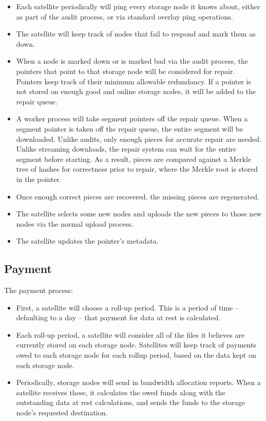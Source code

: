 \documentclass[11pt,fleqn,openany]{book}
\begin{document}
\begin{itemize}
\item Each satellite periodically will ping every storage node it knows
about,
  either as part of the audit process, or via standard overlay ping operations.
\item The satellite will keep track of nodes that fail to respond and mark
  them as down.
\item When a node is marked down or is marked bad via the audit process, the
  pointers that point to that storage node will be considered for repair.
  Pointers
  keep track of their minimum allowable redundancy. If a pointer is not stored
  on enough good and online storage nodes, it will be added to the repair queue.
\item A worker process will take segment pointers off the repair queue. When
  a segment pointer is taken off the repair queue, the entire segment will be
  downloaded. Unlike audits, only enough pieces for accurate repair are needed.
  Unlike streaming downloads, the repair system can wait for the entire segment
  before starting. As a result, pieces are compared against a Merkle tree of
  hashes for correctness prior to repair, where the Merkle root is stored in
  the pointer.
\item Once enough correct pieces are recovered, the missing pieces are
  regenerated.
\item The satellite selects some new nodes and uploads the new pieces to
  those new nodes via the normal upload process.
\item The satellite updates the pointer's metadata.
\end{itemize}

\subsection{Payment}

The payment process:

\begin{itemize}
\item First, a satellite will choose a roll-up period. This is a period of
  time -- defaulting to a day -- that payment for data at rest is calculated.
\item Each roll-up period, a satellite will consider all of the files it
  believes are currently stored on each storage node. Satellites will keep track
of payments owed to each storage node for each rollup period, based on
the data kept on each storage node.
\item Periodically, storage nodes will send in bandwidth allocation reports.
When a
  satellite receives these, it calculates the owed funds along with the
  outstanding data at rest calculations, and sends the funds to the storage
  node's requested destination.
\end{itemize}
\end{document}
